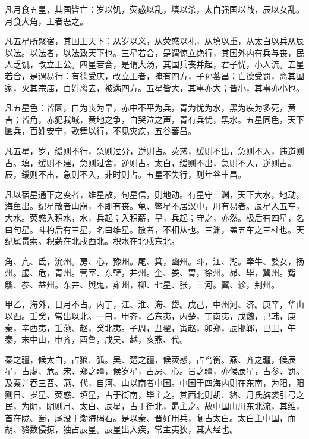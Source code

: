 \documentclass[12pt,UTF8]{ctexbook}
\begin{document}
凡月食五星，其国皆亡：岁以饥，荧惑以乱，填以杀，太白强国以战，辰以女乱。月食大角，王者恶之。



凡五星所聚宿，其国王天下：从岁以义，从荧惑以礼，从填以重，从太白以兵从辰以法。以法者，以法致天下也。三星若合，是谓惊立绝行，其国外内有兵与丧，民人乏饥，改立王公。四星若合，是谓大汤，其国兵丧并起，君子忧，小人流。五星若合，是谓易行：有德受庆，改立王者，掩有四方，子孙蕃昌；亡德受罚，离其国家，灭其宗庙，百姓离去，被满四方。五星皆大，其事亦大；皆小，其事亦小也。



凡五星色：皆圜，白为丧为旱，赤中不平为兵，青为忧为水，黑为疾为多死，黄吉；皆角，赤犯我城，黄地之争，白哭泣之声，青有兵忧，黑水。五星同色，天下匽兵，百姓安宁，歌舞以行，不见灾疾，五谷蕃昌。



凡五星，岁，缓则不行，急则过分，逆则占。荧惑，缓则不出，急则不入，违道则占。填，缓则不建，急则过舍，逆则占。太白，缓则不出，急则不入，逆则占。辰，缓则不出，急则不入，非时则占。五星不失行，则年谷丰昌。



凡以宿星通下之变者，维星散，句星信，则地动。有星守三渊，天下大水，地动，海鱼出。纪星散者山崩，不即有丧。龟、鳖星不居汉中，川有易者。辰星入五车，大水。荧惑入积水，水，兵起；入积薪，旱，兵起；守之，亦然。极后有四星，名曰句星。斗杓后有三星，名曰维星。散者，不相从也。三渊，盖五车之三柱也。天纪属贯索。积薪在北戍西北。积水在北戍东北。



角、亢、氐，沇州。房、心，豫州。尾、箕，幽州。斗，江、湖。牵牛、婺女，扬州。虚、危，青州。营室、东壁，并州。奎、娄、胃，徐州。昴、毕，冀州。觜觿、参、益州。东井、舆鬼，雍州，柳、七星、张，三河。翼、轸，荆州。



甲乙，海外，日月不占。丙丁，江、淮、海、岱。戊己，中州河、济。庚辛，华山以西。壬癸，常出以北。一曰，甲齐，乙东夷，丙楚，丁南夷，戊魏，己韩，庚秦，辛西夷，壬燕、赵，癸北夷。子周，丑翟，寅赵，卯郑，辰邯郸，已卫，午秦，末中山，申齐，酉鲁，戌吴、越，亥燕、代。



秦之疆，候太白，占狼、弧。吴、楚之疆，候荧惑，占鸟衡。燕、齐之疆，候辰星，占虚、危。宋、郑之疆，候岁星，占房、心。晋之疆，亦候辰星，占参、罚。及秦并吞三晋、燕、代，自河、山以南者中国。中国于四海内则在东南，为阳，阳则日、岁星、荧惑、填星，占于街南，毕主之。其西北则胡、貉、月氏旃裘引弓之民，为阴，阴则月、太白、辰星，占于街北，昴主之。故中国山川东北流，其维，首在陇、蜀，尾没于渤海碣石。是以秦、晋好用兵，复占太白。太白主中国，而胡、貉数侵掠，独占辰星。辰星出入疾，常主夷狄，其大经也。
\end{document}
